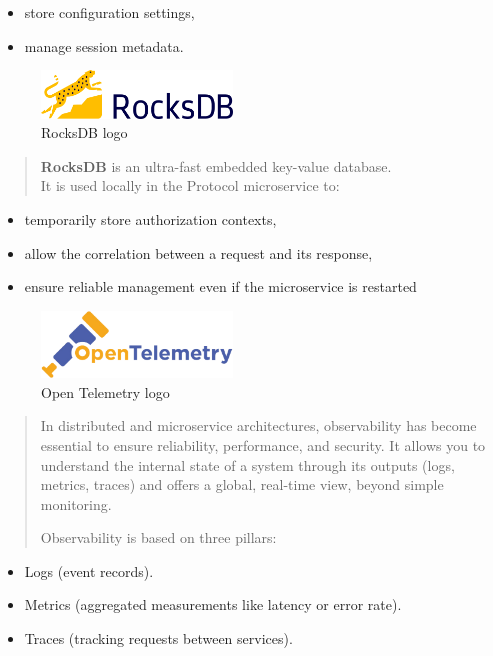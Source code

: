 \documentclass[12pt,a4paper]{report}
\begin{document}
\begin{itemize}
\item store configuration settings,
\item manage session metadata.
\end{itemize}



\begin{figure}[H]
\centering
\includegraphics[width=2in]{media/image87.png}
\caption{RocksDB logo}
\label{fig:SIL}
\end{figure} 
\begin{quote}
\textbf{RocksDB} is an ultra-fast embedded key-value database.\\
It is used locally in the Protocol microservice to:
\end{quote}

\begin{itemize}
\item
  temporarily store authorization contexts,
\item
  allow the correlation between a request and its response,
\item
  ensure reliable management even if the microservice is restarted
\end{itemize}

\begin{figure}[H]
\centering
\includegraphics[width=2in]{media/image88.png}
\caption{Open Telemetry logo}
\label{fig:otel-logo}
\end{figure}

\begin{quote}
In distributed and microservice architectures, observability has become
essential to ensure reliability, performance, and security. It allows
you to understand the internal state of a system through its outputs
(logs, metrics, traces) and offers a global, real-time view, beyond
simple monitoring.

Observability is based on three pillars:
\end{quote}

\begin{itemize}
\item
  Logs (event records).
\item
  Metrics (aggregated measurements like latency or error rate).
\item
  Traces (tracking requests between services).
\end{itemize}
\end{document}
